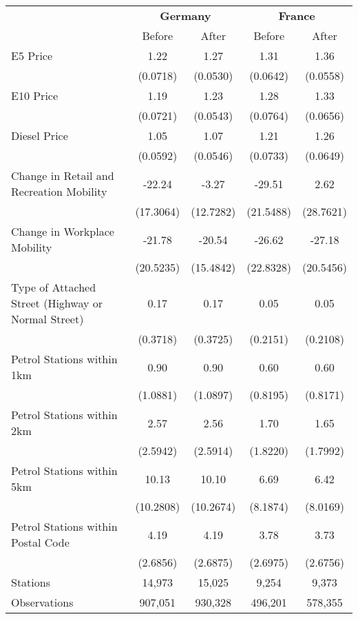 \begin{tabular}{l*{4}{c}}
\toprule
                    &\multicolumn{2}{c}{\textbf{Germany}}&\multicolumn{2}{c}{\textbf{France}}\\\cmidrule(lr){2-3}\cmidrule(lr){4-5}
                    &\multicolumn{1}{c}{Before}&\multicolumn{1}{c}{After}&\multicolumn{1}{c}{Before}&\multicolumn{1}{c}{After}\\
\midrule
E5 Price            &        1.22&        1.27&        1.31&        1.36\\
                    &    (0.0718)&    (0.0530)&    (0.0642)&    (0.0558)\\
E10 Price           &        1.19&        1.23&        1.28&        1.33\\
                    &    (0.0721)&    (0.0543)&    (0.0764)&    (0.0656)\\
Diesel Price        &        1.05&        1.07&        1.21&        1.26\\
                    &    (0.0592)&    (0.0546)&    (0.0733)&    (0.0649)\\
Change in Retail and Recreation Mobility&      -22.24&       -3.27&      -29.51&        2.62\\
                    &   (17.3064)&   (12.7282)&   (21.5488)&   (28.7621)\\
Change in Workplace Mobility&      -21.78&      -20.54&      -26.62&      -27.18\\
                    &   (20.5235)&   (15.4842)&   (22.8328)&   (20.5456)\\
Type of Attached Street (Highway or Normal Street)&        0.17&        0.17&        0.05&        0.05\\
                    &    (0.3718)&    (0.3725)&    (0.2151)&    (0.2108)\\
Petrol Stations within 1km&        0.90&        0.90&        0.60&        0.60\\
                    &    (1.0881)&    (1.0897)&    (0.8195)&    (0.8171)\\
Petrol Stations within 2km&        2.57&        2.56&        1.70&        1.65\\
                    &    (2.5942)&    (2.5914)&    (1.8220)&    (1.7992)\\
Petrol Stations within 5km&       10.13&       10.10&        6.69&        6.42\\
                    &   (10.2808)&   (10.2674)&    (8.1874)&    (8.0169)\\
Petrol Stations within Postal Code&        4.19&        4.19&        3.78&        3.73\\
                    &    (2.6856)&    (2.6875)&    (2.6975)&    (2.6756)\\
\midrule
Stations            &      14,973&      15,025&       9,254&       9,373\\
Observations        &     907,051&     930,328&     496,201&     578,355\\
\bottomrule
\end{tabular}
